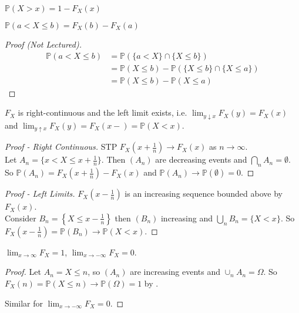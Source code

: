 \begin{claim}
    $\mathbb{P}(X > x) = 1 - F_X(x)$
\end{claim} 

\begin{claim}
    $\mathbb{P}(a < X \leq b) = F_X(b) - F_X(a)$
\end{claim} 

\begin{proof}[Proof (Not Lectured)]
    \begin{align*}
        \mathbb{P}(a<X\leq b) &= \mathbb{P}\left( \{a<X\}\cap \{X\leq b\} \right) \\
        &=\mathbb{P}(X\leq b) - \mathbb{P}\left( \{X\leq b\}\cap \{X\leq a\} \right) \\
        &=\mathbb{P}(X\leq b) - \mathbb{P}(X\leq a)
    \end{align*}
\end{proof}

\begin{claim}
    $F_X$ is right-continuous and the left limit exists, i.e. $\lim_{y \downarrow x} F_X(y) = F_X(x)$ and $\lim_{y \uparrow x} F_X(y) = F_X(x -) = \mathbb{P}(X < x)$.
\end{claim} 

\begin{proof}[Proof - Right Continuous]
    STP $F_X \left(x + \frac{1}{n}\right) \to F_X(x)$ as $n \to \infty$. \\
    Let $A_n = \{x<X\leq x+\frac{1}{n}\}$.
    Then $(A_n)$ are decreasing events and $\bigcap_n A_n = \emptyset$. \\
    So $\mathbb{P}(A_n) = F_X \left(x + \frac{1}{n}\right) - F_X(x)$ and $\mathbb{P}(A_n) \to \mathbb{P}(\emptyset) = 0$.
\end{proof} 

\begin{proof}[Proof - Left Limits]
    $F_X \left(x - \frac{1}{n}\right)$ is an increasing sequence bounded above by $F_X(x)$. \\
    Consider $B_n = \left\{X \leq x - \frac{1}{n}\right\}$ then $(B_n)$ increasing and $\bigcup_n B_n = \{X < x\}$.
    So $F_X \left(x - \frac{1}{n}\right) = \mathbb{P}(B_n) \to \mathbb{P}(X < x)$.
\end{proof} 

\begin{claim}
    $\lim_{x \to \infty} F_X = 1$, $\lim_{x \to - \infty} F_X = 0$.
\end{claim} 

\begin{proof}
    Let $A_n = {X \leq n}$, so $(A_n)$ are increasing events and $\cup_n A_n = \Omega$.
    So $F_X(n) = \mathbb{P}(X \leq n) \to \mathbb{P}(\Omega) = 1$ by .

    Similar for $\lim_{x \to - \infty} F_X = 0$.
\end{proof} 

